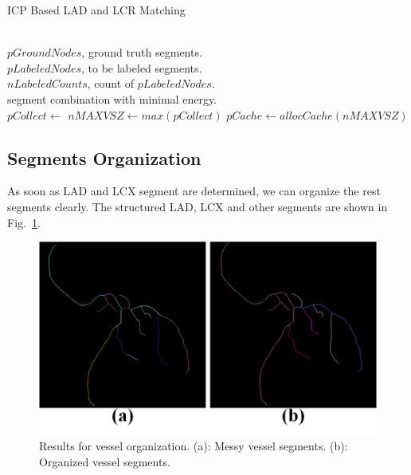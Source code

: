 \documentclass[journal]{IEEEtran}
\begin{document}
\begin{algorithm}
  \caption{ICP Based LAD and LCR Matching}
  \label{alg:icp_matching}
  \renewcommand{\algorithmicrequire}{\textbf{Input:}}
  \renewcommand{\algorithmicensure}{\textbf{Output:}}
  \begin{algorithmic}[]
  \Require ~~\\
    $pGroundNodes$, ground truth segments.\\
    $pLabeledNodes$, to be labeled segments.\\
    $nLabeledCounts$, count of $pLabeledNodes$.
  \Ensure ~~\\
    segment combination with minimal energy. \\

  \State $pCollect \gets $
  \State $nMAXVSZ \gets max(pCollect)$
  \State $pCache \gets allocCache(nMAXVSZ)$
    \State {}
  \EndFor
  \EndFunction
  \end{algorithmic}
\end{algorithm}



\subsection{Segments Organization}
As soon as LAD and LCX segment are determined, we can organize the rest segments clearly. The structured LAD, LCX and other segments are shown in Fig.~\ref{fig:segments_orga_result}.

\begin{figure}[!t]
\centering
\includegraphics[width=1.0\linewidth]{./images/segments_orga_result.png}
\caption{Results for vessel organization. (a): Messy vessel segments. (b): Organized vessel segments.}
\label{fig:segments_orga_result}
\end{figure}
\end{document}
